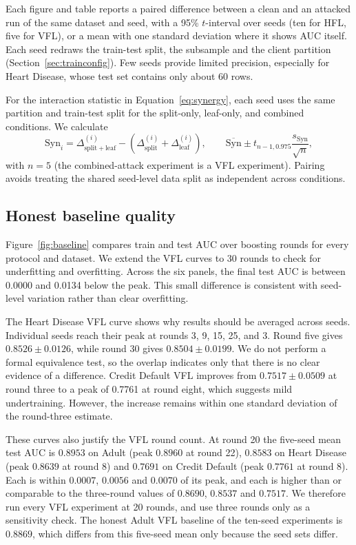 \documentclass[11pt]{article}
\begin{document}
Each figure and table reports a paired difference between a clean and an attacked run of the same dataset and seed, with a 95\% $t$-interval over seeds (ten for HFL, five for VFL), or a mean with one standard deviation where it shows AUC itself. Each seed redraws the train-test split, the subsample and the client partition (Section~\ref{sec:trainconfig}). Few seeds provide limited precision, especially for Heart Disease, whose test set contains only about 60 rows.

For the interaction statistic in Equation~\ref{eq:synergy}, each seed uses the same partition and train-test split for the split-only, leaf-only, and combined conditions. We calculate
\begin{equation}
\mathrm{Syn}_i
=\Delta_{\mathrm{split}+\mathrm{leaf}}^{(i)}
-\left(\Delta_{\mathrm{split}}^{(i)}+\Delta_{\mathrm{leaf}}^{(i)}\right),
\qquad
\overline{\mathrm{Syn}}
\mathbin{\pm}
t_{n-1,0.975}\frac{s_{\mathrm{Syn}}}{\sqrt{n}},
\label{eq:synergyci}
\end{equation}
with $n=5$ (the combined-attack experiment is a VFL experiment). Pairing avoids treating the shared seed-level data split as independent across conditions.

\subsection{Honest baseline quality}
\label{sec:baselinequality}

Figure~\ref{fig:baseline} compares train and test AUC over boosting rounds for every protocol and dataset. We extend the VFL curves to 30 rounds to check for underfitting and overfitting. Across the six panels, the final test AUC is between 0.0000 and 0.0134 below the peak. This small difference is consistent with seed-level variation rather than clear overfitting.

The Heart Disease VFL curve shows why results should be averaged across seeds. Individual seeds reach their peak at rounds 3, 9, 15, 25, and 3. Round five gives $0.8526\pm0.0126$, while round 30 gives $0.8504\pm0.0199$. We do not perform a formal equivalence test, so the overlap indicates only that there is no clear evidence of a difference. Credit Default VFL improves from $0.7517\pm0.0509$ at round three to a peak of 0.7761 at round eight, which suggests mild undertraining. However, the increase remains within one standard deviation of the round-three estimate.

These curves also justify the VFL round count. At round 20 the five-seed mean test AUC is $0.8953$ on Adult (peak $0.8960$ at round 22), $0.8583$ on Heart Disease (peak $0.8639$ at round 8) and $0.7691$ on Credit Default (peak $0.7761$ at round 8). Each is within $0.0007$, $0.0056$ and $0.0070$ of its peak, and each is higher than or comparable to the three-round values of $0.8690$, $0.8537$ and $0.7517$. We therefore run every VFL experiment at 20 rounds, and use three rounds only as a sensitivity check. The honest Adult VFL baseline of the ten-seed experiments is $0.8869$, which differs from this five-seed mean only because the seed sets differ.
\end{document}
